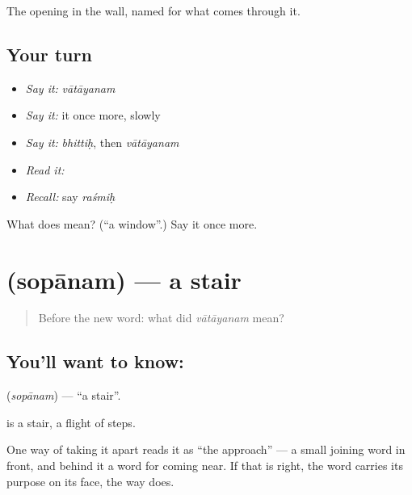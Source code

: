 \begin{grammarlens}[title={What you've built}]
The opening in the wall, named for what comes through it.
\end{grammarlens}

\subsection*{Your turn}
\begin{itemize}
\raggedright
  \item \emph{Say it:} \emph{vātāyanam}
  \item \emph{Say it:} it once more, slowly
  \item \emph{Say it:} \emph{bhittiḥ}, then \emph{vātāyanam}
  \item \emph{Read it:} \textbf{}
  \item \emph{Recall:} say \emph{raśmiḥ}
\end{itemize}

\begin{tcolorbox}[breakable,colback=teal!4,colframe=teal!35!black,title={Before you move on}]
What does  mean? (\textquotedblleft{}a window\textquotedblright{}.) Say it once more.
\end{tcolorbox}
\section[\texorpdfstring{\sk{सोपानम्} (sopānam)}{सोपानम् (sopānam)}]{ (sopānam) — a stair}

\label{lesson:SA-C47-stair}



\begin{quote}
Before the new word: what did \emph{vātāyanam} mean?
\end{quote}

\subsection*{You'll want to know: }
\textbf{} (\emph{sopānam}) — \textquotedblleft{}a stair\textquotedblright{}.

\textbf{} is a stair, a flight of steps.

One way of taking it apart reads it as \textquotedblleft{}the approach\textquotedblright{} — a small joining word in front, and behind it a word for coming near. If that is right, the word carries its purpose on its face, the way  does.

